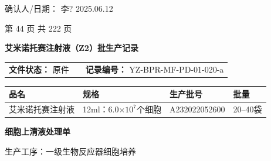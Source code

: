 \documentclass[UTF8,10pt,a4paper,fontset=fandol]{ctexart}
\newcommand{\fieldvalue}[1]{#1}
\newcommand{\handwritten}[1]{#1}
\begin{document}
\noindent
确认人/日期：
\fieldvalue{\handwritten{李?}}
\quad
\fieldvalue{\handwritten{2025.06.12}}

\vfill

\begin{center}
第 44 页 共 222 页
\end{center}

\newpage

\begin{center}
{\Large\textbf{艾米诺托赛注射液（Z2）批生产记录}}
\end{center}

\noindent
\begin{tabularx}{\textwidth}{@{}lXr@{}}
\textbf{文件状态：}%
\fieldvalue{原件}
&
&
\textbf{记录编号：}%
\fieldvalue{YZ-BPR-MF-PD-01-020-a}
\\
\end{tabularx}

\vspace{0.3em}

\begin{center}
\small
\begin{tabularx}{\textwidth}{|>{\centering\arraybackslash}X|>{\centering\arraybackslash}X|>{\centering\arraybackslash}X|>{\centering\arraybackslash}X|}
\hline
品名 & 规格 & 生产批号 & 批量 \\
\hline
\fieldvalue{艾米诺托赛注射液}
&
\fieldvalue{12ml：6.0$\times 10^{7}$个细胞}
&
\fieldvalue{\handwritten{A232022052600}}
&
\fieldvalue{\handwritten{20--40袋}}
\\
\hline
\end{tabularx}
\end{center}

\begin{center}
{\large\textbf{细胞上清液处理单}}
\end{center}

\noindent
生产工序：一级生物反应器细胞培养

\vspace{0.8em}
\end{document}
